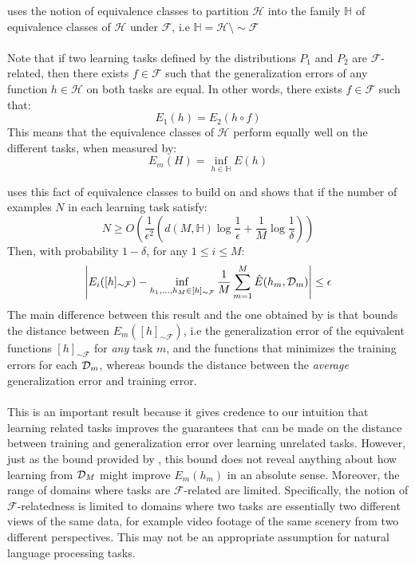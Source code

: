 \citet{ben2003} uses the notion of equivalence classes to partition $\mathcal{H}$ into the family $\mathbb{H}$ of equivalence classes of $\mathcal{H}$ under $\mathcal{F}$, i.e $\mathbb{H} = \mathcal{H} \setminus \sim \mathcal{F}$
\\\\
Note that if two learning tasks defined by the distributions $P_1$ and $P_2$ are $\mathcal{F}$-related, then there exists $f \in \mathcal{F}$ such that the generalization errors of any function $h \in \mathcal{H}$ on both tasks are equal. In other words, there exists $f \in \mathcal{F}$ such that:
$$
E_1(h) = E_2(h \circ f)
$$
This means that the equivalence classes of $\mathcal{H}$ perform equally well on the different tasks, when measured by:
$$
E_m(H) = \inf\limits_{h \in \mathbb{H}}E(h)
$$

\citet{ben2003} uses this fact of equivalence classes to build on \citet{baxter2000} and shows that if the number of examples $N$ in each learning task satisfy:
$$
N \geq O\left(\frac{1}{\epsilon^2}\left(d(M, \mathbb{H}) \log \frac{1}{\epsilon} + \frac{1}{M} \log \frac{1}{\delta}\right)\right)
$$
Then, with probability $1 - \delta$, for any $1 \leq i \leq M$:
$$
\left| E_i([h]_{\sim \mathcal{F}}) - \inf\limits_{h_1,\dots,h_M \in [h]_{\sim \mathcal{F}}} \frac{1}{M}\sum\limits_{m = 1}^M \hat{E}(h_m, \mathcal{D}_m)\right|  \leq \epsilon
$$
The main difference between this result and the one obtained by \citet{baxter2000} is that \citet{ben2003} bounds the distance between $E_m([h]_{\sim \mathcal{F}})$, i.e the generalization error of the equivalent functions $[h]_{\sim \mathcal{F}}$ for \emph{any} task $m$, and the functions that minimizes the training errors for each $\mathcal{D}_m$, whereas \citet{baxter2000} bounds the distance between the \emph{average} generalization error and training error.
\\\\
This is an important result because it gives credence to our intuition that learning related tasks improves the guarantees that can be made on the distance between training and generalization error over learning unrelated tasks. However, just as the bound provided by \citet{baxter2000}, this bound does not reveal anything about how learning from $\mathcal{D}_M$ might improve $E_m(h_m)$ in an absolute sense. Moreover, the range of domains where tasks are $\mathcal{F}$-related are limited. Specifically, the notion of $\mathcal{F}$-relatedness is limited to domains where two tasks are essentially two different views of the same data, for example video footage of the same scenery from two different perspectives. This may not be an appropriate assumption for natural language processing tasks.
